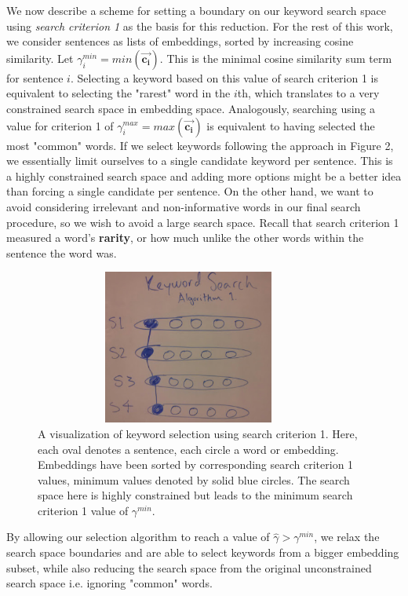 \documentclass[12pt]{article}
\begin{document}
We now describe a scheme for setting a boundary on our keyword search space using \textit{search criterion 1} as the basis for this reduction. For the rest of this work, we consider sentences as lists of embeddings, sorted by increasing cosine similarity. Let $\gamma_{i}^{min}= min(\bm{\vec{c_i}})$. This is the minimal cosine similarity sum term for sentence $i$. Selecting a keyword based on this value of search criterion 1 is equivalent to selecting the "rarest" word in the $i$th, which translates to a very constrained search space in embedding space. Analogously, searching using a value for criterion 1 of $\gamma_{i}^{max} = max(\bm{\vec{c_i}})$ is equivalent to having selected the most "common" words. If we select keywords following the approach in Figure 2, we essentially limit ourselves to a single candidate keyword per sentence. This is a highly constrained search space and adding more options might be a better idea than forcing a single candidate per sentence. On the other hand, we want to avoid considering irrelevant and non-informative words in our final search procedure, so we wish to avoid a large search space. Recall that search criterion 1 measured a word's \textbf{rarity}, or how much unlike the other words within the sentence the word was.

\begin{figure}[H]
\centering
\includegraphics[height=2in, width=4in]{Images/KeywordSearchAlg1.png}
\caption{A visualization of keyword selection using search criterion 1. Here, each oval denotes a sentence, each circle a word or embedding. Embeddings have been sorted by corresponding search criterion 1 values, minimum values denoted by solid blue circles. The search space here is highly constrained but leads to the minimum search criterion 1 value of $\gamma^{min}$.}
\end{figure}

By allowing our selection algorithm to reach a value of $\hat{\gamma} > \gamma^{min}$, we relax the search space boundaries and are able to select keywords from a bigger embedding subset, while also reducing the search space from the original unconstrained search space i.e. ignoring "common" words.
\end{document}
